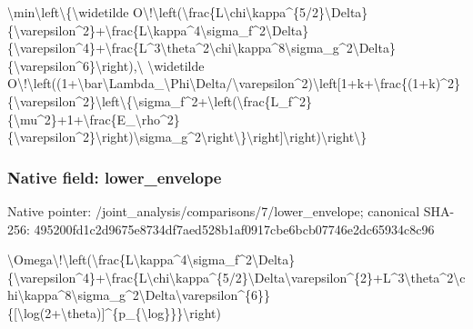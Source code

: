 \documentclass[10pt,a4paper]{article}
\begin{document}
\textbackslash{}min\textbackslash{}left\textbackslash{}\{\textbackslash{}widetilde O\textbackslash{}!\textbackslash{}left(\textbackslash{}frac\{L\textbackslash{}chi\textbackslash{}kap\allowbreak{}pa\textasciicircum{}\{5/2\}\textbackslash{}Delta\}\{\textbackslash{}varepsi\allowbreak{}lon\textasciicircum{}2\}+\textbackslash{}frac\{L\textbackslash{}kappa\textasciicircum{}4\textbackslash{}s\allowbreak{}igma\_f\textasciicircum{}2\textbackslash{}Delta\}\{\textbackslash{}varepsi\allowbreak{}lon\textasciicircum{}4\}+\textbackslash{}frac\{L\textasciicircum{}3\textbackslash{}theta\textasciicircum{}2\allowbreak{}\textbackslash{}chi\textbackslash{}kappa\textasciicircum{}8\textbackslash{}sigma\_g\textasciicircum{}2\textbackslash{}D\allowbreak{}elta\}\{\textbackslash{}varepsilon\textasciicircum{}6\}\textbackslash{}rig\allowbreak{}ht),\textbackslash{} \textbackslash{}widetilde O\textbackslash{}!\textbackslash{}left((1+\textbackslash{}bar\textbackslash{}Lambda\_\allowbreak{}\textbackslash{}Phi\textbackslash{}Delta/\textbackslash{}varepsilon\textasciicircum{}2\allowbreak{})\textbackslash{}left[1+k+\textbackslash{}frac\{(1+k)\textasciicircum{}2\allowbreak{}\}\{\textbackslash{}varepsilon\textasciicircum{}2\}\textbackslash{}left\textbackslash{}\{\textbackslash{}\allowbreak{}sigma\_f\textasciicircum{}2+\textbackslash{}left(\textbackslash{}frac\{L\_\allowbreak{}f\textasciicircum{}2\}\{\textbackslash{}mu\textasciicircum{}2\}+1+\textbackslash{}frac\{E\_\textbackslash{}r\allowbreak{}ho\textasciicircum{}2\}\{\textbackslash{}varepsilon\textasciicircum{}2\}\textbackslash{}rig\allowbreak{}ht)\textbackslash{}sigma\_g\textasciicircum{}2\textbackslash{}right\textbackslash{}\}\textbackslash{}ri\allowbreak{}ght]\textbackslash{}right)\textbackslash{}right\textbackslash{}\}


\subsubsection{Native field: lower\_envelope}


Native pointer: /joint\_analysis/comparis\allowbreak{}ons/7/lower\_envelope; canonical SHA-256: 495200fd1c2d9675e8734df7\allowbreak{}aed528b1af0917cbe6bcb077\allowbreak{}46e2dc65934c8c96


\textbackslash{}Omega\textbackslash{}!\textbackslash{}left(\textbackslash{}frac\{L\textbackslash{}ka\allowbreak{}ppa\textasciicircum{}4\textbackslash{}sigma\_f\textasciicircum{}2\textbackslash{}Delta\}\{\textbackslash{}\allowbreak{}varepsilon\textasciicircum{}4\}+\textbackslash{}frac\{L\textbackslash{}ch\allowbreak{}i\textbackslash{}kappa\textasciicircum{}\{5/2\}\textbackslash{}Delta\textbackslash{}vare\allowbreak{}psilon\textasciicircum{}\{2\}+L\textasciicircum{}3\textbackslash{}theta\textasciicircum{}2\textbackslash{}\allowbreak{}chi\textbackslash{}kappa\textasciicircum{}8\textbackslash{}sigma\_g\textasciicircum{}2\textbackslash{}De\allowbreak{}lta\textbackslash{}varepsilon\textasciicircum{}\{6\}\}\{[\textbackslash{}l\allowbreak{}og(2+\textbackslash{}theta)]\textasciicircum{}\{p\_\{\textbackslash{}log\}\}\allowbreak{}\}\textbackslash{}right)
\end{document}
